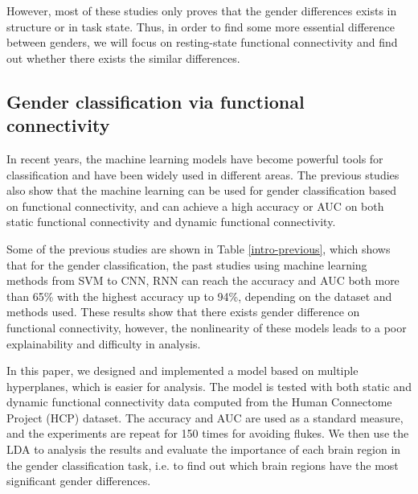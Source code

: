 \documentclass[11pt]{article}
\begin{document}
However, most of these studies only proves that the gender differences exists in structure or in task state. Thus, in order to find some more essential difference between genders, we will focus on resting-state functional connectivity and find out whether there exists the similar differences.

\subsection{Gender classification via functional connectivity}

In recent years, the machine learning models have become powerful tools for classification and have been widely used in different areas. The previous studies also show that the machine learning can be used for gender classification based on functional connectivity, and can achieve a high accuracy or AUC on both static functional connectivity\cite{Al_Zoubi2020-ij}\cite{Leming2021-on}\cite{Weis2020-cc}\cite{Zhang2018-fi} and dynamic functional connectivity\cite{Fan2020-ql}\cite{Menon2019-ef}\cite{Sen2021-ws}.

Some of the previous studies are shown in Table \ref{intro-previous}, which shows that for the gender classification, the past studies using machine learning methods from SVM to CNN, RNN can reach the accuracy and AUC both more than 65\% with the highest accuracy up to 94\%, depending on the dataset and methods used. These results show that there exists gender difference on functional connectivity, however, the nonlinearity of these models leads to a poor explainability and difficulty in analysis.

In this paper, we designed and implemented a model based on multiple hyperplanes, which is easier for analysis. The model is tested with both static and dynamic functional connectivity data computed from the Human Connectome Project (HCP) dataset. The accuracy and AUC are used as a standard measure, and the experiments are repeat for 150 times for avoiding flukes. We then use the LDA to analysis the results and evaluate the importance of each brain region in the gender classification task, i.e. to find out which brain regions have the most significant gender differences.
\end{document}
